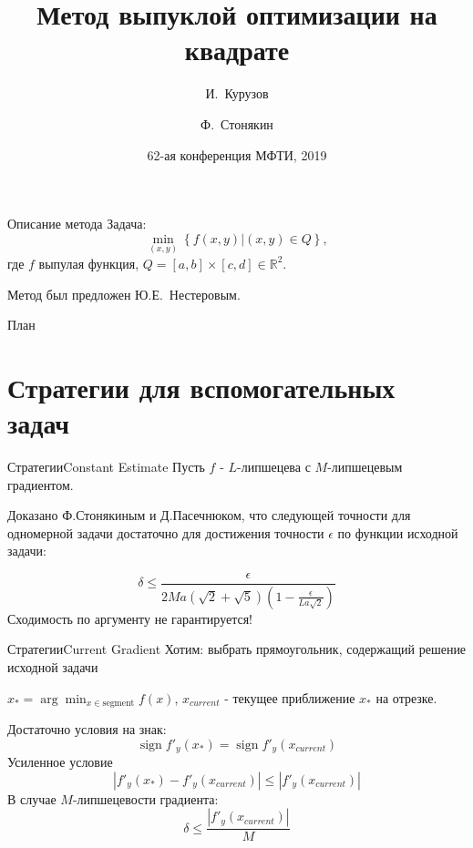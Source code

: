 \documentclass{beamer}
\title{Метод выпуклой оптимизации на квадрате}
\author{И.~Курузов\inst{1} \and Ф.~Стонякин\inst{1, 2}}
\institute[MIPT] %
{
  \inst{1}%
Московский Физико-Технический Институт
  \and
  \inst{2}%
Крымский Федеральный Университет имени В.И.~Вернандского
}
\date{62-ая конференция МФТИ, 2019}
\DeclareMathOperator{\sign}{sign}
\begin{document}
\begin{frame}
  \titlepage
\end{frame}


\begin{frame}{Описание метода}
Задача:
$$\min_{(x,y)}\left\{f(x,y)|(x,y) \in Q\right\},$$
где $f$ выпулая функция, $Q = [a,b]\times[c, d]\in \mathbb{R}^2$.

\pause

Метод был предложен Ю.Е.~Нестеровым.
\end{frame}

\begin{frame}{План}
  \tableofcontents
\end{frame}


\section{Стратегии для вспомогательных задач}

\begin{frame}{Стратегии}{Constant Estimate}
Пусть $f$ - $L$-липшецева с $M$-липшецевым градиентом.

Доказано Ф.Стонякиным и Д.Пасечнюком, что следующей точности для одномерной задачи достаточно для достижения точности $\epsilon$ по функции исходной задачи:

$$\boxed{\delta \leq \frac{\epsilon}{2Ma(\sqrt{2}+\sqrt{5})(1-\frac{\epsilon}{La\sqrt{2}})}}$$
\pause
Сходимость по аргументу не гарантируется!
\end{frame}

\begin{frame}{Стратегии}{Current Gradient}
Хотим: выбрать прямоугольник, содержащий решение исходной задачи
\pause

$x_* =\arg\min_{x \in \text{segment}}f(x)$, $x_{current}$ - текущее приближение $x_*$ на отрезке.

Достаточно условия на знак:
    $$\sign f'_y(x_*) = \sign f'_y(x_{current})$$
\pause    
Усиленное условие
    $$|f'_y(x_*) - f'_y(x_{current})| \leq |f'_y(x_{current})|$$
\pause
В случае $M$-липшецевости градиента:
  $$\boxed{\delta \leq \frac{|f'_y(x_{current})|}{M}}$$
\end{frame}
\end{document}
